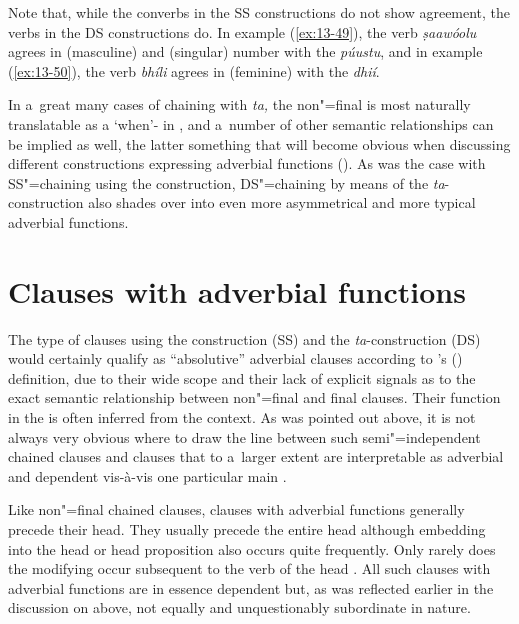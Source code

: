 Note that, while the converbs in the SS constructions do not show agreement, the verbs in the DS constructions do. In example (\ref{ex:13-49}), the  verb \textit{ṣaawóolu} agrees in (masculine)  and (singular) number with the  \textit{púustu}, and in example (\ref{ex:13-50}), the verb \textit{bhíli} agrees in (feminine)  with the  \textit{dhií}. 


In a~great many cases of chaining with \textit{ta,} the non"=final  is most naturally translatable as a `when'- in \iliEnglish, and a~number of other semantic relationships can be implied as well, the latter something that will become obvious when discussing different constructions expressing adverbial functions (). As was the case with SS"=chaining using the  construction, DS"=chaining by means of the \textit{ta}-construction also shades over into even more asymmetrical and more typical adverbial functions. 


\section{Clauses with adverbial functions}
\label{sec:13-4}

The type of clauses using the  construction (SS) and the \textit{ta}-construction (DS) would certainly qualify as ``absolutive'' adverbial clauses according to \citeauthor{thompsonetal2007}'s (\citeyear[264--266]{thompsonetal2007}) definition, due to their wide scope and their lack of explicit signals as to the exact semantic relationship between non"=final and final clauses. Their function in the  is often inferred from the context. As was pointed out above, it is not always very obvious where to draw the line between such semi"=independent chained clauses and clauses that to a~larger extent are interpretable as adverbial and dependent vis-à-vis one particular main . 



Like non"=final chained clauses, clauses with adverbial functions generally precede their head. They usually precede the entire head  although embedding into the head  or head proposition also occurs quite frequently. Only rarely does the modifying  occur subsequent to the verb of the head . All such clauses with adverbial functions are in essence dependent but, as was reflected earlier in the discussion on  above, not equally and unquestionably subordinate in nature. 



